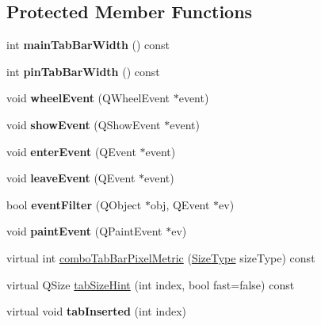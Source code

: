 \subsection*{Protected Member Functions}
\begin{DoxyCompactItemize}
\item 
\hypertarget{class_combo_tab_bar_abe7ceb107e863285c858cb24bc895844}{
int {\bfseries mainTabBarWidth} () const }
\label{class_combo_tab_bar_abe7ceb107e863285c858cb24bc895844}

\item 
\hypertarget{class_combo_tab_bar_a3509e98c3e69c1f708b342d39aef3e7e}{
int {\bfseries pinTabBarWidth} () const }
\label{class_combo_tab_bar_a3509e98c3e69c1f708b342d39aef3e7e}

\item 
\hypertarget{class_combo_tab_bar_a3d365b44cdd5420ef9237cf483b3aab4}{
void {\bfseries wheelEvent} (QWheelEvent $\ast$event)}
\label{class_combo_tab_bar_a3d365b44cdd5420ef9237cf483b3aab4}

\item 
\hypertarget{class_combo_tab_bar_a5b078b04fc16e00b91fbea9b3c062113}{
void {\bfseries showEvent} (QShowEvent $\ast$event)}
\label{class_combo_tab_bar_a5b078b04fc16e00b91fbea9b3c062113}

\item 
\hypertarget{class_combo_tab_bar_a544941e84284cad88c47eb3d992a0899}{
void {\bfseries enterEvent} (QEvent $\ast$event)}
\label{class_combo_tab_bar_a544941e84284cad88c47eb3d992a0899}

\item 
\hypertarget{class_combo_tab_bar_a6e1abbacc023355aa7db27f1499ef7f3}{
void {\bfseries leaveEvent} (QEvent $\ast$event)}
\label{class_combo_tab_bar_a6e1abbacc023355aa7db27f1499ef7f3}

\item 
\hypertarget{class_combo_tab_bar_a2a1b7d5605c97f99238d2bcbb8ab9c41}{
bool {\bfseries eventFilter} (QObject $\ast$obj, QEvent $\ast$ev)}
\label{class_combo_tab_bar_a2a1b7d5605c97f99238d2bcbb8ab9c41}

\item 
\hypertarget{class_combo_tab_bar_a591bd7d1efe029de98eb6e140286a58d}{
void {\bfseries paintEvent} (QPaintEvent $\ast$ev)}
\label{class_combo_tab_bar_a591bd7d1efe029de98eb6e140286a58d}

\item 
virtual int \hyperlink{class_combo_tab_bar_abfe5f8784d0433283bca4c087f0d2b42}{comboTabBarPixelMetric} (\hyperlink{class_combo_tab_bar_a1b4d1e5b7dbc95dcf040b481e00760bc}{SizeType} sizeType) const 
\item 
virtual QSize \hyperlink{class_combo_tab_bar_aedd5c86124231d4d5df2bbc297edf046}{tabSizeHint} (int index, bool fast=false) const 
\item 
\hypertarget{class_combo_tab_bar_a9d85cfc014fde05f25de00854f3c2fb3}{
virtual void {\bfseries tabInserted} (int index)}
\label{class_combo_tab_bar_a9d85cfc014fde05f25de00854f3c2fb3}


\end{DoxyCompactItemize}

